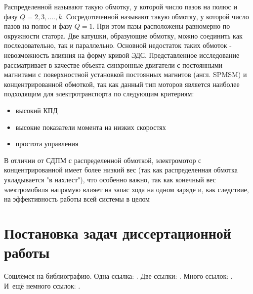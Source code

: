 Распределенной называют такую обмотку, у которой число пазов на полюс и фазу $Q = 2, 3,...., k$.
Сосредоточенной называют такую обмотку, у которой число пазов на полюс и фазу $Q = 1$. При этом пазы расположены равномерно по окружности статора. Две катушки, образующие обмотку, можно соединить как последовательно, так и параллельно. Основной недостаток таких обмоток - невозможность влияния на форму кривой ЭДС.
Представленное исследование рассматривает в качестве объекта синхронные двигатели с постоянными магнитами с поверхностной установкой постоянных магнитов (англ. SPMSM) и концентрированной обмоткой, так как данный тип моторов является наиболее подходящим для электротранспорта по следующим критериям: 

\begin{itemize}
\item высокий КПД
\item высокие показатели момента на низких скоростях
\item простота управления
\end{itemize}

В отличии от СДПМ с распределенной обмоткой, электромотор с концентрированной имеет более низкий вес (так как распределенная обмотка укладывается "в нахлест"), что особенно важно, так как конечный вес электромобиля напрямую влияет на запас хода на одном заряде и, как следствие, на эффективность работы всей системы в целом


\section{Постановка задач диссертационной работы}
\label{sec:ch1/sec3}


Сошлёмся на библиографию.
Одна ссылка: \cite[с.~54]{Sokolov}\cite[с.~36]{Gaidaenko}.
Две ссылки: \cite{Sokolov,Gaidaenko}.
Много ссылок: %
\cite{Lermontov, Management, Borozda, Marketing, Constitution, FamilyCode,
Gost.7.0.53, Razumovski, Lagkueva, Pokrovski, Methodology, Nasirova, Berestova,
Kriger}%
%
.
И~ещё немного ссылок:
\cite{Article,Book,Booklet,Conference,Inbook,Incollection,Manual,Mastersthesis,
Misc,Phdthesis,Proceedings,Techreport,Unpublished}
\cite{medvedev2006jelektronnye, CEAT:CEAT581, doi:10.1080/01932691.2010.513279,
Gosele1999161,Li2007StressAnalysis, Shoji199895, test:eisner-sample,
test:eisner-sample-shorted, AB_patent_Pomerantz_1968, iofis_patent1960}
%
.


